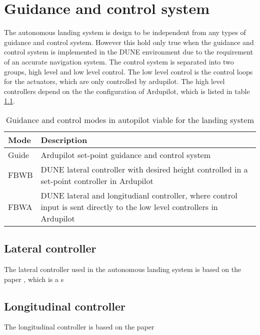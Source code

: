 \chapter{Guidance and control system}
The autonomous landing system is design to be independent from any types of guidance and control system. However this hold only true when the guidance and control system is implemented in the DUNE environment due to the requirement of an accurate navigation system. The control system is separated into two groups, high level and low level control. The low level control is the control loops for the actuators, which are only controlled by ardupilot. The high level controllers depend on the the configuration of Ardupilot, which is listed in table \ref{tb:ArduPilotMode}.
\begin{table}
\centering
\begin{tabular}{| p{3cm} | p{5cm}|}
\hline
\textbf{Mode}	&	\textbf{Description} \\ \hline
Guide			& Ardupilot set-point guidance and control system 												\\ \hline
FBWB			& DUNE lateral controller with desired height controlled in a set-point controller in Ardupilot \\ \hline
FBWA			& DUNE lateral and longitudianl controller, where control input is sent directly to the low level controllers in Ardupilot 																						\\ \hline
\end{tabular}
\caption{Guidance and control modes in autopilot viable for the landing system}
\label{tb:ArduPilotMode}
\end{table}

\section{Lateral controller}
The lateral controller used in the autonomous landing system is based on the paper \citep{fortuna2015cascaded}, which is a s
\section{Longitudinal controller}
The longitudinal controller is based on the paper \citep{you2012guidance}